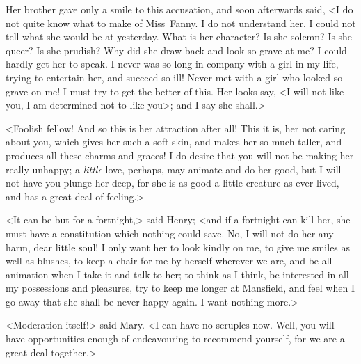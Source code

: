 Her brother gave only a smile to this accusation, and soon afterwards said, <I do not quite know what to make of Miss~Fanny. I do not understand her. I could not tell what she would be at yesterday. What is her character? Is she solemn? Is she queer? Is she prudish? Why did she draw back and look so grave at me? I could hardly get her to speak. I never was so long in company with a girl in my life, trying to entertain her, and succeed so ill! Never met with a girl who looked so grave on me! I must try to get the better of this. Her looks say, <I will not like you, I am determined not to like you>; and I say she shall.>

<Foolish fellow! And so this is her attraction after all! This it is, her not caring about you, which gives her such a soft skin, and makes her so much taller, and produces all these charms and graces! I do desire that you will not be making her really unhappy; a \textit{little}  love, perhaps, may animate and do her good, but I will not have you plunge her deep, for she is as good a little creature as ever lived, and has a great deal of feeling.>

<It can be but for a fortnight,> said Henry; <and if a fortnight can kill her, she must have a constitution which nothing could save. No, I will not do her any harm, dear little soul! I only want her to look kindly on me, to give me smiles as well as blushes, to keep a chair for me by herself wherever we are, and be all animation when I take it and talk to her; to think as I think, be interested in all my possessions and pleasures, try to keep me longer at Mansfield, and feel when I go away that she shall be never happy again. I want nothing more.>

<Moderation itself!> said Mary. <I can have no scruples now. Well, you will have opportunities enough of endeavouring to recommend yourself, for we are a great deal together.>

